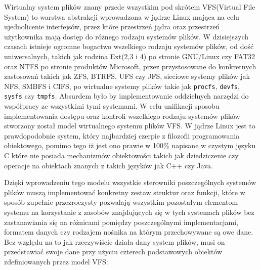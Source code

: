 Wirtualny system plików znany przede wszystkim pod skrótem VFS(Virtual
File System) to warstwa abstrakcji wprowadzona w jądrze Linux mająca na
celu ujednolicenie interfejsów, przez które przestrzeń jądra oraz
przestrzeń użytkownika mają dostęp do różnego rodzaju systemów plików. W
dzisiejszych czasach istnieje ogromne bogactwo wszelkiego rodzaju
systemów plików, od dość uniwersalnych, takich jak rodzina Ext(2,3 i 4)
po stronie GNU/Linux czy FAT32 oraz NTFS po stronie produktów Microsoft,
przez przystosowane do konkretnych zastosowań takich jak ZFS, BTRFS, UFS
czy JFS, sieciowe systemy plików jak NFS, SMBFS i CIFS, po wirtualne
systemy plików takie jak \texttt{procfs}, \texttt{devfs}, \texttt{sysfs}
czy \texttt{tmpfs}. Absurdem było by implementowanie oddzielnych
narzędzi do współpracy ze wszystkimi tymi systemami. W celu unifikacji
sposobu implementowania dostępu oraz kontroli wszelkiego rodzaju
systemów plików stworzony został model wirtualnego systemu plików VFS. W
jądrze Linux jest to prawdopodobnie system, który najbardziej czerpie z
filozofii programowania obiektowego, pomimo tego iż jest ono prawie w
100\% napisane w czystym języku C które nie posiada mechanizmów
obiektowości takich jak dziedziczenie czy operacje na obiektach znanych
z takich języków jak C++ czy Java.

Dzięki wprowadzeniu tego modelu wszystkie sterowniki poszczególnych
systemów plików muszą implementować konkretny zestaw struktur oraz
funkcji, które w sposób zupełnie przezroczysty pozwalają wszystkim
pozostałym elementom systemu na korzystanie z zasobów znajdujących się w
tych systemach plików bez zastanawiania się na różnicami pomiędzy
poszczególnymi implementacjami, formatem danych czy rodzajem nośnika na
którym przechowywane są owe dane. Bez względu na to jak rzeczywiście
działa dany system plików, musi on przedstawiać swoje dane przy użyciu
czterech podstawowych obiektów zdefiniowanych przez model VFS:

